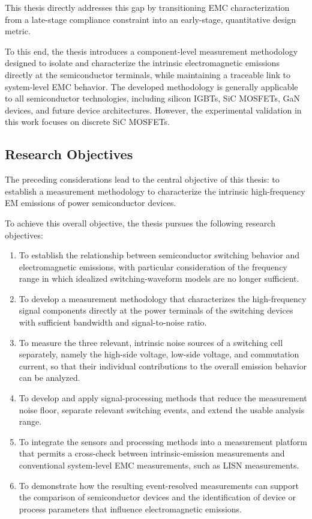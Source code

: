 This thesis directly addresses this gap by transitioning EMC characterization from a late-stage compliance constraint into an early-stage, quantitative design metric.

To this end, the thesis introduces a component-level measurement methodology designed to isolate and characterize the intrinsic electromagnetic emissions directly at the semiconductor terminals, while maintaining a traceable link to system-level EMC behavior. 
The developed methodology is generally applicable to all semiconductor technologies, including silicon IGBTs, SiC MOSFETs, GaN devices, and future device architectures. 
However, the experimental validation in this work focuses on discrete SiC MOSFETs.

\subsection*{Research Objectives}

The preceding considerations lead to the central objective of this thesis: to establish a measurement methodology to characterize the intrinsic high-frequency EM emissions of power semiconductor devices. 

To achieve this overall objective, the thesis pursues the following research objectives:
\begin{enumerate}
	\item To establish the relationship between semiconductor switching behavior and electromagnetic emissions, with particular consideration of the frequency range in which idealized switching-waveform models are no longer sufficient.
	\item To develop a measurement methodology that characterizes the high-frequency signal components directly at the power terminals of the switching devices with sufficient bandwidth and signal-to-noise ratio.
	\item To measure the three relevant, intrinsic noise sources of a switching cell separately, namely the high-side voltage, low-side voltage, and commutation current, so that their individual contributions to the overall emission behavior can be analyzed.
	\item To develop and apply signal-processing methods that reduce the measurement noise floor, separate relevant switching events, and extend the usable analysis range.
	\item To integrate the sensors and processing methods into a measurement platform that permits a cross-check between intrinsic-emission measurements and conventional system-level EMC measurements, such as LISN measurements.
	\item To demonstrate how the resulting event-resolved measurements can support the comparison of semiconductor devices and the identification of device or process parameters that influence electromagnetic emissions.
\end{enumerate}

